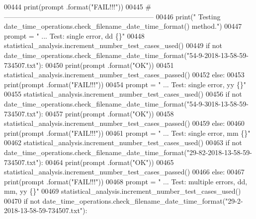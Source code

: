 \begin{DoxyCode}
00444             print(prompt .format(\textcolor{stringliteral}{"FAIL!!!"}))
00445         \textcolor{comment}{# -----------------------------------------------------------------}
00446         print(\textcolor{stringliteral}{" Testing date\_time\_operations.check\_filename\_date\_time\_format() method."})
00447         prompt = \textcolor{stringliteral}{"  ... Test: single error, dd              \{\}"}
00448         statistical\_analysis.increment\_number\_test\_cases\_used()
00449         \textcolor{keywordflow}{if} \textcolor{keywordflow}{not} date\_time\_operations.check\_filename\_date\_time\_format(\textcolor{stringliteral}{"54-9-2018-13-58-59-734507.txt"}):
00450             print(prompt .format(\textcolor{stringliteral}{"OK"}))
00451             statistical\_analysis.increment\_number\_test\_cases\_passed()
00452         \textcolor{keywordflow}{else}:
00453             print(prompt .format(\textcolor{stringliteral}{"FAIL!!!"}))
00454         prompt = \textcolor{stringliteral}{"  ... Test: single error, yy              \{\}"}
00455         statistical\_analysis.increment\_number\_test\_cases\_used()
00456         \textcolor{keywordflow}{if} \textcolor{keywordflow}{not} date\_time\_operations.check\_filename\_date\_time\_format(\textcolor{stringliteral}{"54-9-3018-13-58-59-734507.txt"}):
00457             print(prompt .format(\textcolor{stringliteral}{"OK"}))
00458             statistical\_analysis.increment\_number\_test\_cases\_passed()
00459         \textcolor{keywordflow}{else}:
00460             print(prompt .format(\textcolor{stringliteral}{"FAIL!!!"}))
00461         prompt = \textcolor{stringliteral}{"  ... Test: single error, mm              \{\}"}
00462         statistical\_analysis.increment\_number\_test\_cases\_used()
00463         \textcolor{keywordflow}{if} \textcolor{keywordflow}{not} date\_time\_operations.check\_filename\_date\_time\_format(\textcolor{stringliteral}{"29-82-2018-13-58-59-734507.txt"}):
00464             print(prompt .format(\textcolor{stringliteral}{"OK"}))
00465             statistical\_analysis.increment\_number\_test\_cases\_passed()
00466         \textcolor{keywordflow}{else}:
00467             print(prompt .format(\textcolor{stringliteral}{"FAIL!!!"}))
00468         prompt = \textcolor{stringliteral}{"  ... Test: multiple errors, dd, mm, yy           \{\}"}
00469         statistical\_analysis.increment\_number\_test\_cases\_used()
00470         \textcolor{keywordflow}{if} \textcolor{keywordflow}{not} date\_time\_operations.check\_filename\_date\_time\_format(\textcolor{stringliteral}{"29-2-2018-13-58-59-734507.txt"}):

\end{DoxyCode}
